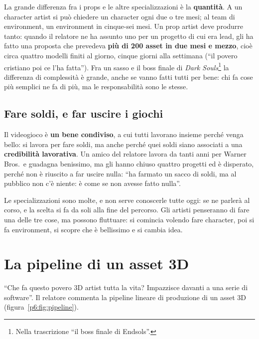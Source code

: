 La grande differenza fra i props e le altre specializzazioni è la
\textbf{quantità}. A un character artist si può chiedere un character ogni due
o tre mesi; al team di environment, un environment in cinque-sei mesi. Un prop
artist deve produrre tanto: quando il relatore ne ha assunto uno per un
progetto di cui era lead, gli ha fatto una proposta che prevedeva \textbf{più
di 200 asset in due mesi e mezzo}, cioè circa quattro modelli finiti al giorno,
cinque giorni alla settimana (``il povero cristiano poi ce l'ha fatta''). Fra un
sasso e il boss finale di \emph{Dark Souls}\footnote{Nella trascrizione ``il
boss finale di Endsols''.} la differenza di complessità è grande, anche se
vanno fatti tutti per bene: chi fa cose più semplici ne fa di più, ma le
responsabilità sono le stesse.

\subsection{Fare soldi, e far uscire i giochi}

Il videogioco è \textbf{un bene condiviso}, a cui tutti lavorano insieme perché
venga bello: si lavora per fare soldi, ma anche perché quei soldi siano
associati a una \textbf{credibilità lavorativa}. Un amico del relatore lavora da
tanti anni per Warner Bros.\ e guadagna benissimo, ma gli hanno chiuso quattro
progetti ed è disperato, perché non è riuscito a far uscire nulla: ``ha farmato
un sacco di soldi, ma al pubblico non c'è niente: è come se non avesse fatto
nulla''.

Le specializzazioni sono molte, e non serve conoscerle tutte oggi: se ne
parlerà al corso, e la scelta si fa da soli alla fine del percorso. Gli artisti
penseranno di fare una delle tre cose, ma possono fluttuare: si comincia
volendo fare character, poi si fa environment, si scopre che è bellissimo e si
cambia idea.

\section{La pipeline di un asset 3D}
\label{p6:sec:pipeline}

``Che fa questo povero 3D artist tutta la vita? Impazzisce davanti a una serie
di software''. Il relatore commenta la pipeline lineare di produzione di un
asset 3D (figura~\ref{p6:fig:pipeline}).

